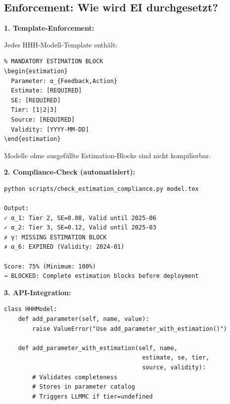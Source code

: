 \subsection{Enforcement: Wie wird EI durchgesetzt?}

\begin{tcolorbox}[colback=blue!5!white, colframe=blue!75!black,
    title=\textbf{Enforcement-Mechanismen für Estimation Interface}]

\textbf{1. Template-Enforcement:}

Jedes HHH-Modell-Template enthält:
\begin{verbatim}
% MANDATORY ESTIMATION BLOCK
\begin{estimation}
  Parameter: α_{Feedback,Action}
  Estimate: [REQUIRED]
  SE: [REQUIRED]
  Tier: [1|2|3]
  Source: [REQUIRED]
  Validity: [YYYY-MM-DD]
\end{estimation}
\end{verbatim}

Modelle ohne ausgefüllte Estimation-Blocks sind nicht kompilierbar.

\medskip
\textbf{2. Compliance-Check (automatisiert):}

\begin{verbatim}
python scripts/check_estimation_compliance.py model.tex

Output:
✓ α_1: Tier 2, SE=0.08, Valid until 2025-06
✓ α_2: Tier 3, SE=0.12, Valid until 2025-03
✗ γ: MISSING ESTIMATION BLOCK
✗ α_6: EXPIRED (Validity: 2024-01)

Score: 75% (Minimum: 100%)
→ BLOCKED: Complete estimation blocks before deployment
\end{verbatim}

\medskip
\textbf{3. API-Integration:}

\begin{verbatim}
class HHHModel:
    def add_parameter(self, name, value):
        raise ValueError("Use add_parameter_with_estimation()")

    def add_parameter_with_estimation(self, name,
                                       estimate, se, tier,
                                       source, validity):
        # Validates completeness
        # Stores in parameter catalog
        # Triggers LLMMC if tier=undefined
\end{verbatim}

\end{tcolorbox}

